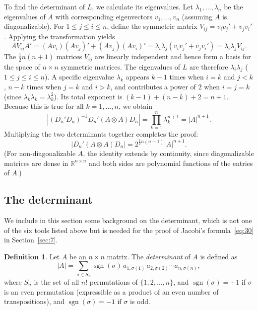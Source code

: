 \documentclass[12pt,a4paper]{article}
\makeatletter
\theoremstyle{definition}
\newtheorem{definition}{Definition}
\renewenvironment{proof}[1][\proofname]{\par
  \pushQED{\qed}%
  \normalfont \topsep6\p@\@plus6\p@\relax
  \trivlist
  \item[\hskip\labelsep\bfseries #1\@addpunct{.}]\ignorespaces
}{%
  \popQED\endtrivlist\@endpefalse
}
\makeatother
\begin{document}
\begin{proof}
To find the determinant of $L$, we calculate its eigenvalues. Let $\lambda_1, \dots, \lambda_n$ be the eigenvalues of $A$ with corresponding eigenvectors $v_1, \dots, v_n$ (assuming $A$ is diagonalizable). For $1 \leqslant j \leqslant i \leqslant n$, define the symmetric matrix $V_{ij} = v_i v_j' + v_j v_i'$. Applying the transformation yields
\[
A V_{ij} A' = (Av_i)(Av_j)' + (Av_j)(Av_i)' = \lambda_i \lambda_j (v_i v_j' + v_j v_i') = \lambda_i \lambda_j V_{ij}.
\]
The $\frac{1}{2}n(n+1)$ matrices $V_{ij}$ are linearly independent and hence form a basis for the space of $n \times n$ symmetric matrices. The eigenvalues of $L$ are therefore $\lambda_i \lambda_j$ ($1 \leqslant j \leqslant i \leqslant n$). A specific eigenvalue $\lambda_k$ appears $k-1$ times when $i=k$ and $j<k$, $n-k$ times when $j=k$ and $i>k$, and contributes a power of $2$ when $i=j=k$ (since $\lambda_k \lambda_k = \lambda_k^2$). Its total exponent is $(k-1) + (n-k) + 2 = n+1$. Because this is true for all $k=1, \dots, n$, we obtain
\[
|(D_n'D_n)^{-1} D_n'(A \otimes A)D_n| = \prod_{k=1}^n \lambda_k^{n+1} = |A|^{n+1}.
\]
Multiplying the two determinants together completes the proof:
\[
|D_n'(A \otimes A)D_n| = 2^{\frac{1}{2}n(n-1)} |A|^{n+1}.
\]
(For non-diagonalizable $A$, the identity extends by continuity, since diagonalizable matrices are dense in $\mathbb{R}^{n \times n}$ and both sides are polynomial functions of the entries of $A$.)
\end{proof}

\subsection{The determinant}\label{sec:2.7}

We include in this section some background on the determinant, which is not one of the six tools listed above but is needed for the proof of Jacobi's formula~\eqref{eq:30} in Section~\ref{sec:7}.

\begin{definition}\label{def:det}
Let $A$ be an $n \times n$ matrix. The \emph{determinant} of $A$ is defined as
\begin{equation}\label{eq:det}
|A| = \sum_{\sigma \in S_n} \operatorname{sgn}(\sigma)\, a_{1,\sigma(1)}\, a_{2,\sigma(2)} \cdots a_{n,\sigma(n)},
\end{equation}
where $S_n$ is the set of all $n!$ permutations of $\{1, 2, \dots, n\}$, and $\operatorname{sgn}(\sigma) = +1$ if $\sigma$ is an even permutation (expressible as a product of an even number of transpositions), and $\operatorname{sgn}(\sigma) = -1$ if $\sigma$ is odd.
\end{definition}
\end{document}
